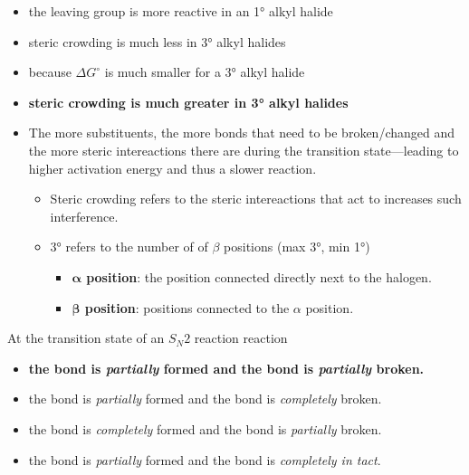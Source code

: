 \documentclass[12pt,a4paper]{article}
\begin{document}
\begin{enumerate}
{    \begin{itemize}
        \item the leaving group is more reactive in an \ang{1} alkyl halide
        \item steric crowding is much less in \ang{3} alkyl halides
        \item because \(\Delta G^\circ\) is much smaller for a \ang{3} alkyl halide
        \item {\color{o-Sun}\textbf{steric crowding is much greater in \ang{3} alkyl halides}}
    \end{itemize}
    }
    \begin{itemize}
        \item The more substituents, the more bonds that need to be broken/changed and the more steric intereactions there are during the transition state---leading to higher activation energy and thus a slower reaction.
            \begin{itemize}
                \item Steric crowding refers to the steric intereactions that act to increases such interference.
                \item \ang{3} refers to the number of of $\beta$ positions (max \ang{3}, min \ang{1})
                    \begin{itemize}
                        \item \textbf{$\bm{\alpha}$ position}: the position connected directly next to the halogen.
                        \item \textbf{$\bm{\beta}$ position}: positions connected to the $\alpha$ position.
                    \end{itemize}
            \end{itemize}
    \end{itemize}
    {\color{G-Moon}\item At the transition state of an \(S_N2\) reaction reaction
    \begin{itemize}
        \item {\color{o-Sun}\textbf{the  bond is \textit{partially} formed and the  bond is \textit{partially} broken.}}
        \item the  bond is \textit{partially} formed and the  bond is \textit{completely} broken.
        \item the  bond is \textit{completely} formed and the  bond is \textit{partially} broken.
        \item the  bond is \textit{partially} formed and the  bond is \textit{completely in tact}.

\end{itemize}}
\end{enumerate}
\end{document}
